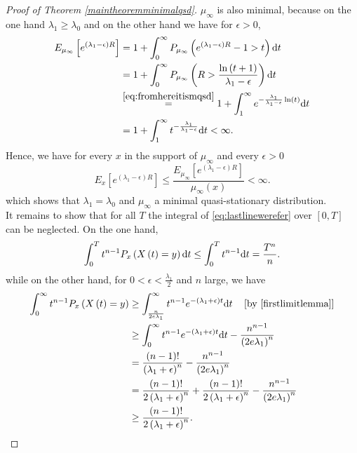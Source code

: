 \documentclass[12pt,a4paper]{scrartcl}
\numberwithin{equation}{section}
\begin{document}
\begin{proof}[Proof of Theorem \ref{maintheoremminimalqsd}]
$\mu_{\infty}$ is also minimal, because on the one hand $\lambda_1 \geq \lambda_0$ and on the other hand we have for $\epsilon > 0$,
\begin{align*}
E_{\mu_{\infty}}\left[e^{\left(\lambda_1-\epsilon\right)R} \right] &= 1 + \int_0^{\infty} P_{\mu_{\infty}}\left(e^{\left(\lambda_1-\epsilon\right)R}-1 > t\right) \textnormal{d}t \\
&=1+ \int_0^{\infty} P_{\mu_{\infty}} \left(R > \frac{\ln\left(t+1\right)}{\lambda_1-\epsilon} \right) \textnormal{d}t \\
&\overset{\eqref{eq:fromhereitismqsd}}{=}1+\int_1^{\infty} e^{-\frac{\lambda_1}{\lambda_1-\epsilon}\ln\left(t\right)} \textnormal{d}t \\
&=1+\int_1^{\infty} t^{-\frac{\lambda_1}{\lambda_1-\epsilon}} \textnormal{d} t < \infty.
\end{align*}
Hence, we have for every $x$ in the support of $\mu_{\infty}$ and every $\epsilon > 0$
$$ E_x\left[e^{\left(\lambda_1-\epsilon\right)R}\right] \leq \frac{E_{\mu_{\infty}}\left[e^{\left(\lambda_1-\epsilon\right)R} \right]}{\mu_{\infty}\left(x\right)} < \infty. $$
which shows that $\lambda_1 = \lambda_0$ and $\mu_{\infty}$ a minimal quasi-stationary distribution.\\[2ex]

It remains to show that for all $T$ the integral of \eqref{eq:lastlinewerefer} over $\left[0,T\right]$ can be neglected. On the one hand,
\begin{equation}
\int_0^T t^{n-1} P_x\left(X\left(t\right) = y \right) \textnormal{d}t \leq \int_0^T t^{n-1} \textnormal{d}t = \frac{T^n}{n}.
\end{equation}
while on the other hand, for $0 < \epsilon < \frac{\lambda_1}{2}$ and $n$ large, we have
\begin{align*}
\int_0^{\infty} t^{n-1} P_x\left(X\left(t\right)=y \right) &\geq \int_{\frac{n}{2e\lambda_1}}^{\infty} t^{n-1} e^{-\left(\lambda_1 + \epsilon \right) t} \textnormal{d}t \quad \left[\textnormal{by \eqref{firstlimitlemma}} \right] \\
&\geq \int_0^{\infty} t^{n-1} e^{-\left(\lambda_1 + \epsilon \right) t } \textnormal{d}t - \frac{n^{n-1}}{\left(2e\lambda_1\right)^n} \\
&= \frac{\left(n-1\right)!}{\left(\lambda_1+\epsilon\right)^n} - \frac{n^{n-1}}{\left(2e\lambda_1\right)^n} \\
&= \frac{\left(n-1\right)!}{2\left(\lambda_1+\epsilon\right)^n} + \frac{\left(n-1\right)!}{2\left(\lambda_1+\epsilon\right)^n} - \frac{n^{n-1}}{\left(2e\lambda_1\right)^n} \\
&\geq \frac{\left(n-1\right)!}{2\left(\lambda_1+\epsilon\right)^n}.
\end{align*}


\end{proof}
\end{document}
